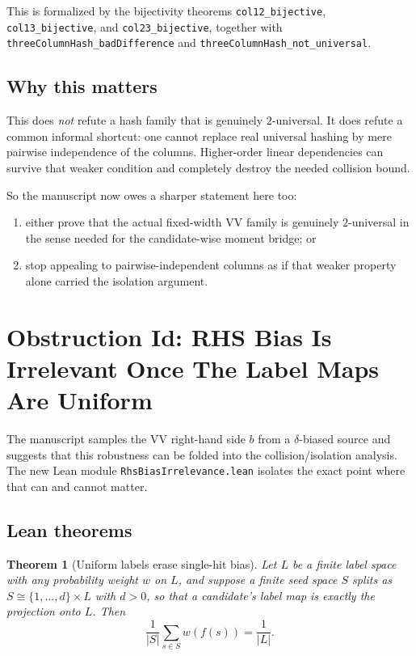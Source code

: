 \documentclass[11pt]{article}
\newtheorem{theorem}{Theorem}[section]
\theoremstyle{remark}
\begin{document}
\noindent
This is formalized by the bijectivity theorems
\texttt{col12\_bijective}, \texttt{col13\_bijective}, and \texttt{col23\_bijective}, together with
\texttt{threeColumnHash\_badDifference} and
\texttt{threeColumnHash\_not\_universal}.

\subsection{Why this matters}

This does \emph{not} refute a hash family that is genuinely \(2\)-universal.  It does refute a
common informal shortcut: one cannot replace real universal hashing by mere pairwise independence
of the columns.  Higher-order linear dependencies can survive that weaker condition and completely
destroy the needed collision bound.

So the manuscript now owes a sharper statement here too:
\begin{enumerate}[leftmargin=1.5em]
  \item either prove that the actual fixed-width VV family is genuinely \(2\)-universal in the
  sense needed for the candidate-wise moment bridge; or
  \item stop appealing to pairwise-independent columns as if that weaker property alone carried the
  isolation argument.
\end{enumerate}

\section{Obstruction Id: RHS Bias Is Irrelevant Once The Label Maps Are Uniform}

The manuscript samples the VV right-hand side \(b\) from a \(\delta\)-biased source and suggests
that this robustness can be folded into the collision/isolation analysis.  The new Lean module
\texttt{RhsBiasIrrelevance.lean} isolates the exact point where that can and cannot matter.

\subsection{Lean theorems}

\begin{theorem}[Uniform labels erase single-hit bias]
Let \(L\) be a finite label space with any probability weight \(w\) on \(L\), and suppose a finite
seed space \(S\) splits as \(S \cong \{1,\dots,d\} \times L\) with \(d>0\), so that a candidate's
label map is exactly the projection onto \(L\).  Then
\[
  \frac{1}{|S|}\sum_{s \in S} w(f(s)) = \frac{1}{|L|}.
\]
\end{theorem}
\end{document}
